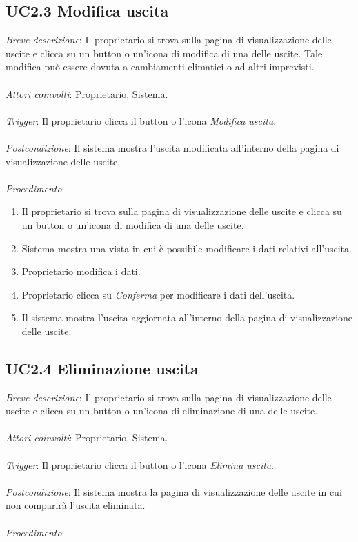 \subsection{UC2.3 Modifica uscita}

\emph{Breve descrizione}: Il proprietario si trova sulla pagina di visualizzazione delle uscite e clicca su un button o un'icona di modifica di una delle uscite.
Tale modifica può essere dovuta a cambiamenti climatici o ad altri imprevisti.
\\\\
\emph{Attori coinvolti}: Proprietario, Sistema.\\\\
\emph{Trigger}: Il proprietario clicca il button o l'icona \textit{Modifica uscita}.\\\\
\emph{Postcondizione}: Il sistema mostra l'uscita modificata all'interno della pagina di visualizzazione delle uscite.\\\\
\emph{Procedimento}:

\begin{enumerate}
    \item Il proprietario si trova sulla pagina di visualizzazione delle uscite e clicca su un button o un'icona di modifica di una delle uscite.
    \item Sistema mostra una vista in cui è possibile modificare i dati relativi all'uscita.
    \item Proprietario modifica i dati.
    \item Proprietario clicca su \textit{Conferma} per modificare i dati dell'uscita.
    \item Il sistema mostra l'uscita aggiornata all'interno della pagina di visualizzazione delle uscite.
\end{enumerate}

\subsection{UC2.4 Eliminazione uscita}

\emph{Breve descrizione}: Il proprietario si trova sulla pagina di visualizzazione delle uscite e clicca su un button o un'icona di eliminazione di una delle uscite.\\\\
\emph{Attori coinvolti}: Proprietario, Sistema.\\\\
\emph{Trigger}: Il proprietario clicca il button o l'icona \textit{Elimina uscita}.\\\\
\emph{Postcondizione}: Il sistema mostra la pagina di visualizzazione delle uscite in cui non comparirà l'uscita eliminata.\\\\
\emph{Procedimento}:

